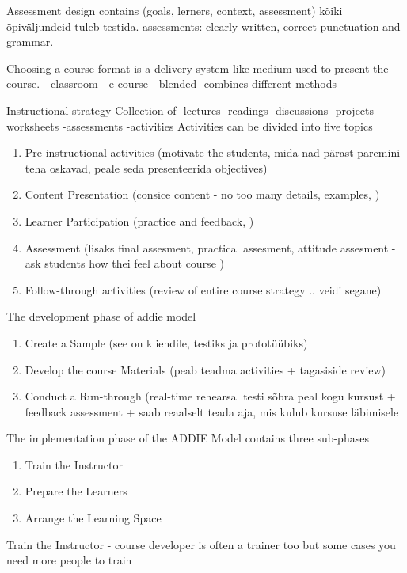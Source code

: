Assessment design contains (goals, lerners, context, assessment)
kõiki õpiväljundeid tuleb testida.
assessments: clearly written, correct punctuation and grammar.

Choosing a course format is a delivery system like medium used to present the course.
- classroom
- e-course
- blended -combines different methods
- 

Instructional strategy
Collection of 
-lectures
-readings
-discussions
-projects
-worksheets
-assessments
-activities
Activities can be divided into five topics
\begin{enumerate}
\item Pre-instructional activities (motivate the students, mida nad pärast paremini teha oskavad, peale seda presenteerida objectives)
\item Content Presentation (consice content - no too many details, examples, )
\item Learner Participation (practice and feedback, )
\item Assessment (lisaks final assesment, practical assesment, attitude assesment  - ask students how thei feel about course )
\item Follow-through activities (review of entire course strategy .. veidi segane)
\end{enumerate}

The development phase of addie model

\begin{enumerate}
\item Create a Sample (see on kliendile, testiks ja prototüübiks)
\item Develop the course Materials (peab teadma activities + tagasiside review)
\item Conduct a Run-through (real-time rehearsal testi sõbra peal kogu kursust +  feedback assessment + saab reaalselt teada aja, mis kulub kursuse läbimisele
\end{enumerate}


The implementation phase of the ADDIE Model contains three sub-phases

\begin{enumerate}
\item Train the Instructor
\item Prepare the Learners
\item Arrange the Learning Space
\end{enumerate}

Train the Instructor - course developer is often a trainer too but some cases you need more people to train




